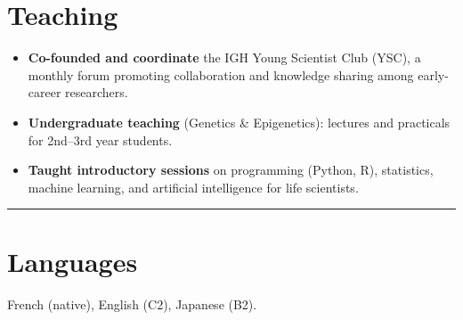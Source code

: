 \documentclass[11pt,a4paper]{article}
\let\oldlabelitemi\labelitemi
\begin{document}
\section*{Teaching}
\renewcommand{\labelitemi}{\faChalkboardTeacher}
\begin{itemize}
    \item \textbf{Co-founded and coordinate} the IGH Young Scientist Club (YSC), a monthly forum promoting collaboration and knowledge sharing among early-career researchers.
    \item \textbf{Undergraduate teaching} (Genetics \& Epigenetics): lectures and practicals for 2nd–3rd year students.
    \item \textbf{Taught introductory sessions} on programming (Python, R), statistics, machine learning, and artificial intelligence for life scientists.
\end{itemize}
\renewcommand{\labelitemi}{\oldlabelitemi}
\noindent\textcolor{sapin}{\rule{\textwidth}{0.6pt}}
\section*{Languages}
French (native), English (C2), Japanese (B2).\\
\vspace{2pt}

\begin{center}
    \qrcode[height=2cm]{\PortfolioLink}
\end{center}
\end{document}
